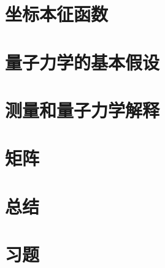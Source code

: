\section{坐标本征函数}
\label{sec:7.7 Position Eigenfunctions}

\section{量子力学的基本假设}
\label{sec:7.8 The Postulates of Quantum Mechanics}

\section{测量和量子力学解释}
\label{sec:7.9 Measurement and the Interpretation of Quantum Mechanics}

\section{矩阵}
\label{sec:7.10 Matrices}

\section*{总结}

\section*{习题}